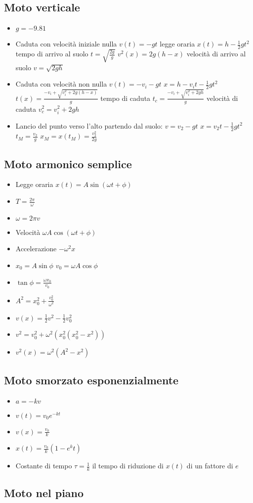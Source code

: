 	\subsection{Moto verticale}
	\begin{itemize}
		\item $g=-9.81$
		\item Caduta con velocit\`a iniziale nulla $v(t) = -gt$ legge oraria $x(t) = h - \frac{1}{2}gt^2$ tempo di arrivo al suolo $t = \sqrt{\frac{2g}{g}}$ $v^2(x) = 2g(h-x)$ velocit\`a di arrivo al suolo $v=\sqrt{2gh}$
		\item Caduta con velocit\`a non nulla $v(t) =-v_i -gt$ $x=h-v_it-\frac{1}{2}gt^2$ $t(x) = \frac{-v_i + \sqrt{v_i^2+2g(h-x)}}{g}$ tempo di caduta $t_c = \frac{-v_i + \sqrt{v_i^2+2gh}}{g}$ velocit\`a di caduta $v_c^2 = v_i^2 + 2gh$
		\item Lancio del punto verso l'alto partendo dal suolo: $v = v_2 - gt$ $x = v_2t - \frac{1}{2}gt^2$ $t_M = \frac{v_2}{g}$ $x_M = x(t_M) = \frac{v_2^2}{2g}$
	\end{itemize}
	\subsection{Moto armonico semplice}
	\begin{itemize}
		\item Legge oraria $x(t)=A\sin(\omega t+\phi)$
		\item $T = \frac{2\pi}{\omega}$
		\item $\omega = 2\pi v$
		\item Velocit\`a $\omega A\cos(\omega t+\phi)$
		\item Accelerazione $-\omega^2 x$
		\item $x_0 = A\sin\phi$ $v_0 = \omega A\cos \phi$
		\item $\tan\phi = \frac{\omega x_0}{v_0}$
		\item $A^2 = x_0^2 + \frac{v_0^2}{\omega^2}$
		\item $v(x) = \frac{1}{2}v^2-\frac{1}{2}v_0^2$
		\item $v^2 = v_0^2+\omega^2(x_0^2(x_0^2 - x^2))$
		\item $v^2(x) = \omega^2(A^2-x^2)$
	\end{itemize}
	\subsection{Moto smorzato esponenzialmente}
	\begin{itemize}
		\item $a = -kv$
		\item $v(t)=v_0e^{-kt}$
		\item $v(x) = \frac{v_0}{k}$
		\item $x(t) = \frac{v_0}{k}(1-e^{k}t)$
		\item Costante di tempo $\tau=\frac{1}{k}$ il tempo di riduzione di $x(t)$ di un fattore di $e$
	\end{itemize}
	\subsection{Moto nel piano}
